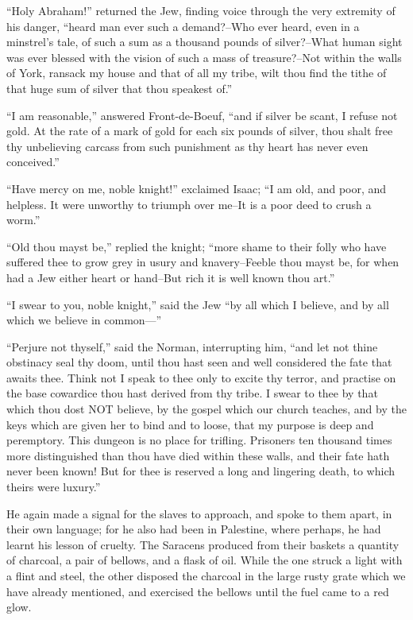 ``Holy Abraham!'' returned the Jew, finding voice through the very
extremity of his danger, ``heard man ever such a demand?--Who ever
heard, even in a minstrel's tale, of such a sum as a thousand pounds of
silver?--What human sight was ever blessed with the vision of such a
mass of treasure?--Not within the walls of York, ransack my house and
that of all my tribe, wilt thou find the tithe of that huge sum of
silver that thou speakest of.''

``I am reasonable,'' answered Front-de-Boeuf, ``and if silver be scant,
I refuse not gold. At the rate of a mark of gold for each six pounds of
silver, thou shalt free thy unbelieving carcass from such punishment as
thy heart has never even conceived.''

``Have mercy on me, noble knight!'' exclaimed Isaac; ``I am old, and
poor, and helpless. It were unworthy to triumph over me--It is a poor
deed to crush a worm.''

``Old thou mayst be,'' replied the knight; ``more shame to their folly
who have suffered thee to grow grey in usury and knavery--Feeble thou
mayst be, for when had a Jew either heart or hand--But rich it is well
known thou art.''

``I swear to you, noble knight,'' said the Jew ``by all which I believe,
and by all which we believe in common---''

``Perjure not thyself,'' said the Norman, interrupting him, ``and let
not thine obstinacy seal thy doom, until thou hast seen and well
considered the fate that awaits thee. Think not I speak to thee only to
excite thy terror, and practise on the base cowardice thou hast derived
from thy tribe. I swear to thee by that which thou dost NOT believe, by
the gospel which our church teaches, and by the keys which are given her
to bind and to loose, that my purpose is deep and peremptory. This
dungeon is no place for trifling. Prisoners ten thousand times more
distinguished than thou have died within these walls, and their fate
hath never been known! But for thee is reserved a long and lingering
death, to which theirs were luxury.''

He again made a signal for the slaves to approach, and spoke to them
apart, in their own language; for he also had been in Palestine, where
perhaps, he had learnt his lesson of cruelty. The Saracens produced from
their baskets a quantity of charcoal, a pair of bellows, and a flask of
oil. While the one struck a light with a flint and steel, the other
disposed the charcoal in the large rusty grate which we have already
mentioned, and exercised the bellows until the fuel came to a red glow.

